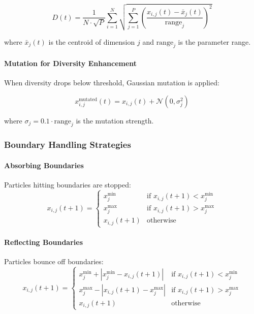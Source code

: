 \documentclass[12pt,a4paper]{article}
\begin{document}
\begin{equation}
D(t) = \frac{1}{N \cdot \sqrt{P}} \sum_{i=1}^{N} \sqrt{\sum_{j=1}^{P} \left(\frac{x_{i,j}(t) - \bar{x}_j(t)}{\text{range}_j}\right)^2} \label{eq:diversity_measure}
\end{equation}

where $\bar{x}_j(t)$ is the centroid of dimension $j$ and $\text{range}_j$ is the parameter range.

\paragraph{Mutation for Diversity Enhancement}
When diversity drops below threshold, Gaussian mutation is applied:

\begin{equation}
x_{i,j}^{\text{mutated}}(t) = x_{i,j}(t) + \mathcal{N}(0, \sigma_j^2) \label{eq:pso_mutation}
\end{equation}

where $\sigma_j = 0.1 \cdot \text{range}_j$ is the mutation strength.

\subsubsection{Boundary Handling Strategies}

\paragraph{Absorbing Boundaries}
Particles hitting boundaries are stopped:
\begin{equation}
x_{i,j}(t+1) = \begin{cases}
x_j^{\min} & \text{if } x_{i,j}(t+1) < x_j^{\min} \\
x_j^{\max} & \text{if } x_{i,j}(t+1) > x_j^{\max} \\
x_{i,j}(t+1) & \text{otherwise}
\end{cases} \label{eq:absorbing_boundaries}
\end{equation}

\paragraph{Reflecting Boundaries}
Particles bounce off boundaries:
\begin{equation}
x_{i,j}(t+1) = \begin{cases}
x_j^{\min} + |x_j^{\min} - x_{i,j}(t+1)| & \text{if } x_{i,j}(t+1) < x_j^{\min} \\
x_j^{\max} - |x_{i,j}(t+1) - x_j^{\max}| & \text{if } x_{i,j}(t+1) > x_j^{\max} \\
x_{i,j}(t+1) & \text{otherwise}
\end{cases} \label{eq:reflecting_boundaries}
\end{equation}
\end{document}
